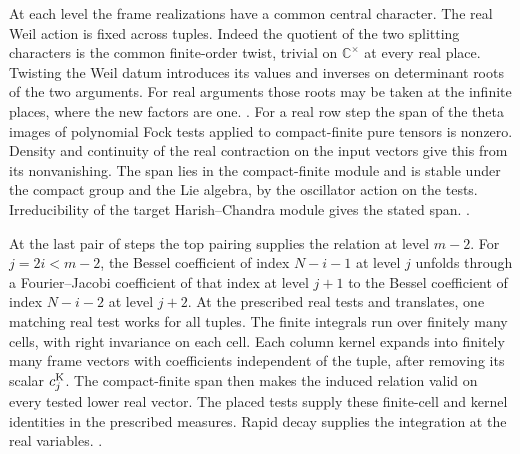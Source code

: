At each level the frame realizations have a common central character.
The real Weil action is fixed across tuples. Indeed the quotient of
the two splitting characters is the common finite-order twist,
trivial on \(\mathbb C^\times\) at every real place. Twisting the
Weil datum introduces its values and inverses on determinant roots
of the two arguments. For real arguments those roots may be taken
at the infinite places, where the new factors are one.
.
For a real row step the span of the theta images of polynomial Fock
tests applied to compact-finite pure tensors is nonzero. Density and
continuity of the real contraction on the input vectors give this from
its nonvanishing. The span lies in the compact-finite module and is
stable under the compact group and the Lie algebra, by the oscillator
action on the tests. Irreducibility of the target Harish--Chandra
module gives the stated span.
.

At the last pair of steps the top pairing supplies the relation at
level \(m-2\). For \(j=2i<m-2\), the Bessel coefficient of index
\(N-i-1\) at level \(j\) unfolds through a Fourier--Jacobi coefficient
of that index at level \(j+1\) to the Bessel coefficient of index
\(N-i-2\) at level \(j+2\). At the prescribed real tests and
translates, one matching real test works for all tuples. The finite
integrals run over finitely many cells, with right invariance on
each cell. Each column kernel expands into finitely many frame
vectors with coefficients independent of the tuple, after removing
its scalar \(c^{\rm K}_j\). The compact-finite span then makes the
induced relation valid on every tested lower real vector. The
placed tests supply these finite-cell and kernel identities in the
prescribed measures. Rapid decay supplies the integration at the
real variables.
.


